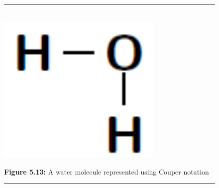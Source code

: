     \setcounter{subfigure}{0}


	\begin{figure}[H] %
    \begin{center}
    \rule[.1in]{\figurerulewidth}{.005in} \\
        \label{m38701*uid21!!!underscore!!!media}\label{m38701*uid21!!!underscore!!!printimage}\includegraphics[width=300px]{col11305.imgs/m38701_CG11C1_015.png} %
        
      \vspace{2pt}
    \vspace{\rubberspace}\par \begin{cnxcaption}
	  \small \textbf{Figure 5.13: }A water molecule represented using Couper notation
	\end{cnxcaption}
      
    \vspace{.1in}
    \rule[.1in]{\figurerulewidth}{.005in} \\
        
    \end{center}

 \end{figure}   

    \addtocounter{footnote}{-0}
    
      
    \setcounter{subfigure}{0}


